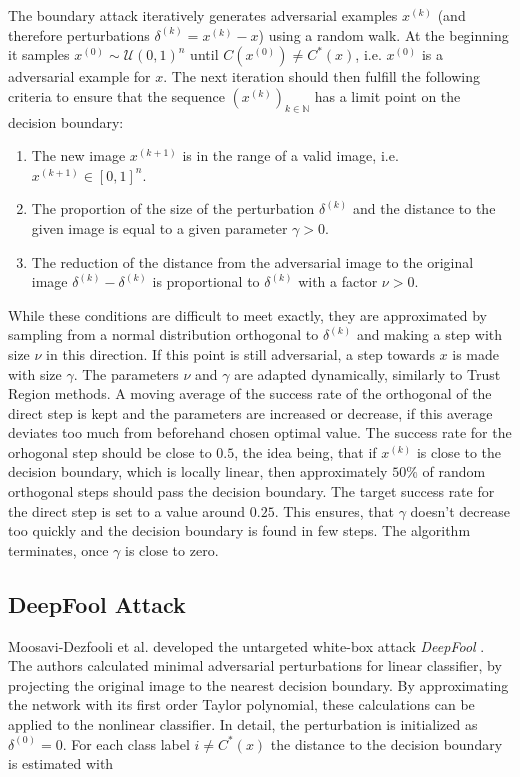The boundary attack iteratively generates adversarial examples $x^{(k)}$ (and therefore perturbations $\delta^{(k)} = x^{(k)} - x$) using a random walk. At the beginning it samples $x^{(0)} \sim \mathcal{U}(0,1)^n$ until $C(x^{(0)}) \neq C^*(x)$, i.e. $x^{(0)}$ is a adversarial example for $x$.
The next iteration should then fulfill the following criteria to ensure that the sequence $(x^{(k)})_{k \in \mathbb{N}}$ has a limit point on the decision boundary:

\begin{enumerate}
	\item The new image $x^{(k+1)}$ is in the range of a valid image,
	i.e. $x^{(k+1)}\in [0,1]^n$.
	\item The proportion of the size of the perturbation $\delta^{(k)}$
	and the distance to the given image is equal to a given parameter
	$\gamma > 0$.
	\item The reduction of the distance from the adversarial image to the
	original image $\delta^{(k)} - \delta^{(k)}$ is proportional to
	$\delta^{(k)}$ with a factor $\nu>0$.
\end{enumerate}

While these conditions are difficult to meet exactly, they are approximated by sampling from a normal distribution orthogonal to $\delta^{(k)}$ and making a step with size $\nu$ in this direction. If this point is still adversarial, a step towards $x$ is made with size $\gamma$. The parameters $\nu$ and $\gamma$ are adapted dynamically, similarly to Trust Region methods.
A moving average of the success rate of the orthogonal of the direct step is kept and the parameters are increased or decrease, if this average deviates too much from beforehand chosen optimal value.
The success rate for the orhogonal step should be close to $0.5$, the idea being, that if $x^{(k)}$ is close to the decision boundary, which is locally linear, then approximately $50\%$ of random orthogonal steps should pass the decision boundary.
The target success rate for the direct step is set to a value around $0.25$. This ensures, that $\gamma$ doesn't decrease too quickly and the decision boundary is found in few steps.
The algorithm terminates, once $\gamma$ is close to zero.

\subsection{DeepFool Attack}
Moosavi-Dezfooli et al. developed the untargeted white-box attack \emph{DeepFool} \cite{deepfool}.
The authors calculated minimal adversarial perturbations for linear classifier, by projecting the original image to the nearest decision boundary. By approximating the network with its first order Taylor polynomial, these calculations can be applied to the nonlinear classifier.
In detail, the perturbation is initialized as $\delta^{(0)} = 0$. For each class label $i \neq C^*(x)$ the distance to the decision boundary is estimated with

